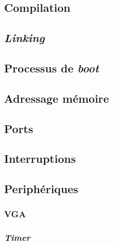 \documentclass[a4paper]{article}
\begin{document}
\subsection{Compilation}


\subsection{\textit{Linking}}


\subsection{Processus de \textit{boot}}


\subsection{Adressage mémoire}


\subsection{Ports}


\subsection{Interruptions}


\subsection{Periphériques}
\subsubsection{VGA}

\subsubsection{\textit{Timer}}
\end{document}
